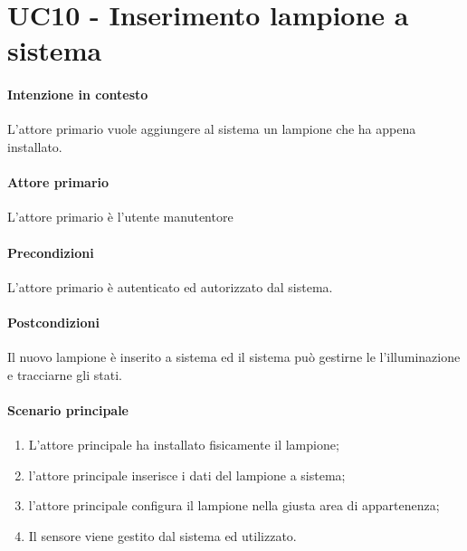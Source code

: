 \section{UC10 - Inserimento lampione a sistema}\label{uc:10}

\paragraph{Intenzione in contesto} L'attore primario vuole aggiungere al sistema un lampione che ha appena installato.

\paragraph{Attore primario} L'attore primario è l'utente manutentore

\paragraph{Precondizioni} L'attore primario è autenticato ed autorizzato dal sistema.

\paragraph{Postcondizioni} Il nuovo lampione è inserito a sistema ed il sistema può gestirne le l'illuminazione e tracciarne gli stati.

\paragraph{Scenario principale}

\begin{enumerate}
    \item L'attore principale ha installato fisicamente il lampione;
    \item l'attore principale inserisce i dati del lampione a sistema;
    \item l'attore principale configura il lampione nella giusta area di appartenenza;
    \item Il sensore viene gestito dal sistema ed utilizzato.
\end{enumerate}

